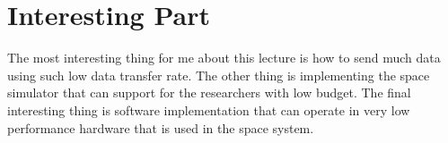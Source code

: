 \section*{Interesting Part}
The most interesting thing for me about this lecture is how to send much data using such low data transfer rate. The other thing is implementing the space simulator that can support for the researchers with low budget. The final interesting thing is software implementation that can operate in very low performance hardware that is used in the space system.